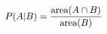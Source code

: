 \documentclass[preview]{standalone}
\begin{document}
\begin{align*}
\special{dvisvgm:raw <g id='unique000'>}P(A|B) = \frac{\text{area}(A \cap B)}{\text{area}(B)}\special{dvisvgm:raw </g>}
\end{align*}
\end{document}
